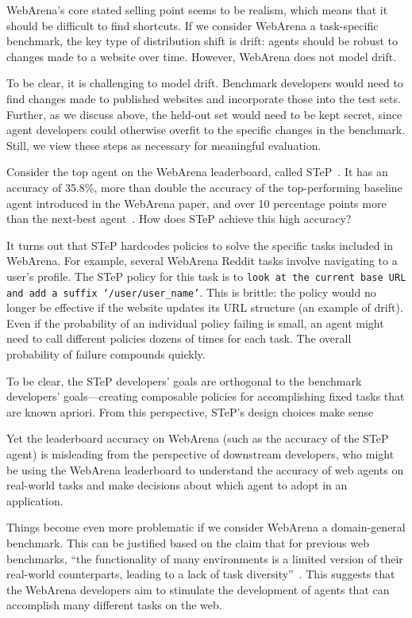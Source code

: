 \documentclass{article}
\begin{document}
WebArena's core stated selling point seems to be realism, which means that it should be difficult to find shortcuts. If we consider WebArena a task-specific benchmark, the key type of distribution shift is drift: agents should be robust to changes made to a website over time. However, WebArena does not model drift. 

To be clear, it is challenging to model drift. Benchmark developers would need to find changes made to published websites and incorporate those into the test sets. Further, as we discuss above, the held-out set would need to be kept secret, since agent developers could otherwise overfit to the specific changes in the benchmark. Still, we view these steps as necessary for meaningful evaluation.


Consider the top agent on the WebArena leaderboard, called STeP~\citep{sodhi_step_2024}. It has an accuracy of 35.8\%, more than double the accuracy of the top-performing baseline agent introduced in the WebArena paper, and over 10 percentage points more than the next-best agent~\citep{drouin_workarena_2024}. How does STeP achieve this high accuracy?

It turns out that STeP hardcodes policies to solve the specific tasks included in WebArena. For example, several WebArena Reddit tasks involve navigating to a user's profile. The STeP policy for this task is to \texttt{look at the current base URL and add a suffix `/user/user\_name'}. This is brittle: the policy would no longer be effective if the website updates its URL structure (an example of drift). Even if the probability of an individual policy failing is small, an agent might need to call different policies dozens of times for each task. The overall probability of failure compounds quickly.

To be clear, the STeP developers' goals are orthogonal to the benchmark developers’ goals---creating composable policies for accomplishing fixed tasks that are known apriori. From this perspective, STeP's design choices make sense

Yet the leaderboard accuracy on WebArena (such as the accuracy of the STeP agent) is misleading from the perspective of downstream developers, who might be using the WebArena leaderboard to understand the accuracy of web agents on real-world tasks and make decisions about which agent to adopt in an application. 

Things become even more problematic if we consider WebArena a domain-general benchmark. This can be justified based on the claim that for previous web benchmarks, ``the functionality of many environments is a limited version of their real-world counterparts, leading to a lack of task diversity''~\citep{zhou_webarena_2024}. This suggests that the WebArena developers aim to stimulate the development of agents that can accomplish many different tasks on the web. 
\end{document}
